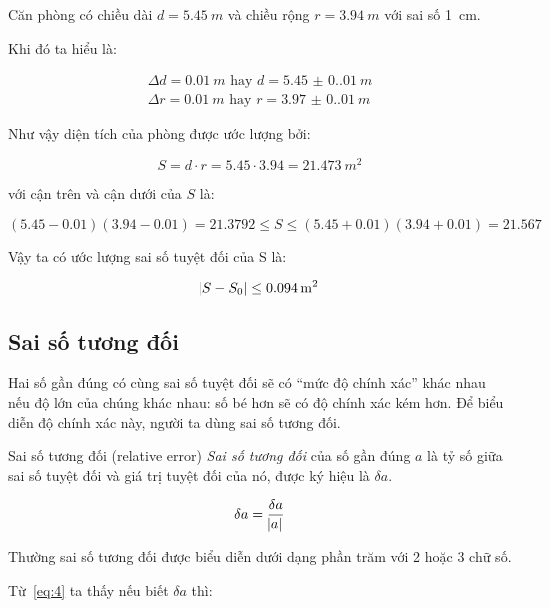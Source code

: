 \documentclass[../../Lectures.tex]{subfiles}
\begin{document}
\begin{exmp}\label{exmp:room_example}
    Căn phòng có chiều dài \(d = \qty{5.45}{m}\) và chiều rộng \(r =
    \qty{3.94}{m}\) với sai số \qty{1}{cm}.

    Khi đó ta hiểu là:

    \begin{gather*}
        \Delta d = \qty{0.01}{m} \text{ hay } d = \qty{5.45(0.01)}{m} \\
        \Delta r = \qty{0.01}{m} \text{ hay } r = \qty{3.97(0.01)}{m}
    \end{gather*}

    Như vậy diện tích của phòng được ước lượng bởi:

    \[S = d \cdot r = \num{5.45} \cdot \num{3.94} = \qty{21.473}{m^2}\]

    với cận trên và cận dưới của \(S\) là:

    \[(\num{5.45} - \num{0.01})(\num{3.94} - \num{0.01}) = \num{21.3792} \leq S \leq (\num{5.45} + \num{0.01})(\num{3.94} + \num{0.01}) = \num{21.567}\]

    Vậy ta có ước lượng sai số tuyệt đối của S là:

    \[\abs{S - S_0} \leq \qty{0.094}{m^2}\]
\end{exmp}

\subsection{Sai số tương đối}

Hai số gần đúng có cùng sai số tuyệt đối sẽ có ``mức độ chính xác'' khác nhau nếu
độ lớn của chúng khác nhau: số bé hơn sẽ có độ chính xác kém hơn. Để biểu diễn
độ chính xác này, người ta dùng sai số tương đối.

\begin{cdefinition}{Sai số tương đối (relative error)}{}
    \emph{Sai số tương đối} của số gần đúng \(a\) là tỷ số giữa sai số tuyệt đối
    và giá trị tuyệt đối của nó, được ký hiệu là \(\delta a\).

    \begin{equation} \label{eq:4}
        \delta a = \frac{\delta a}{\abs{a}}
    \end{equation}
\end{cdefinition}

Thường sai số tương đối được biểu diễn dưới dạng phần trăm với 2 hoặc 3 chữ số.

Từ~\ref{eq:4} ta thấy nếu biết \(\delta a\) thì:
\end{document}
